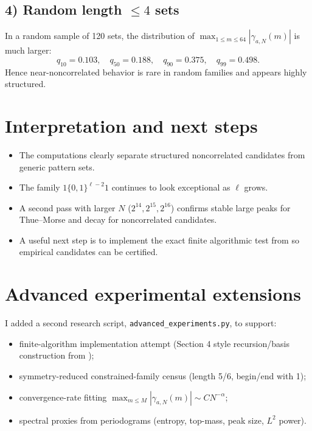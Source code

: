\documentclass[11pt]{article}
\begin{document}
\subsection*{4) Random length $\le 4$ sets}
In a random sample of 120 sets, the distribution of $\max_{1\le m\le 64}|\gamma_{a,N}(m)|$ is much larger:
\[
q_{10}=0.103,\quad q_{50}=0.188,\quad q_{90}=0.375,\quad q_{99}=0.498.
\]
Hence near-noncorrelated behavior is rare in random families and appears highly structured.

\section{Interpretation and next steps}
\begin{itemize}
  \item The computations clearly separate structured noncorrelated candidates from generic pattern sets.
  \item The family $1\{0,1\}^{\ell-2}1$ continues to look exceptional as $\ell$ grows.
  \item A second pass with larger $N$ ($2^{14},2^{15},2^{16}$) confirms stable large peaks for Thue--Morse and decay for noncorrelated candidates.
  \item A useful next step is to implement the exact finite algorithmic test from \cite{Kon21} so empirical candidates can be certified.
\end{itemize}

\section{Advanced experimental extensions}
I added a second research script, \texttt{advanced\_experiments.py}, to support:
\begin{itemize}
  \item finite-algorithm implementation attempt (Section 4 style recursion/basis construction from \cite{Kon21});
  \item symmetry-reduced constrained-family census (length 5/6, begin/end with 1);
  \item convergence-rate fitting $\max_{m\le M}|\gamma_{a,N}(m)|\sim C N^{-\alpha}$;
  \item spectral proxies from periodograms (entropy, top-mass, peak size, $L^2$ power).
\end{itemize}
\end{document}
